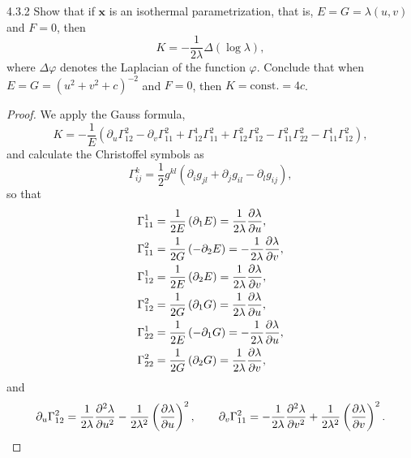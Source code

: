\documentclass[11pt]{article}
\begin{document}
\begin{problem}{4.3.2}
  Show that if \( \mathbf{x} \) is an isothermal parametrization, that is, \( E = G = \lambda(u,v) \) and \( F = 0 \), then
  \begin{equation}
  \label{eq:1}
  K = - \frac{1}{2\lambda}\Delta(\log \lambda),
\end{equation}
where \(\Delta\varphi\) denotes the Laplacian of the function \(\varphi\).
Conclude that when \( E = G = (u^2 + v^2 + c)^{-2} \) and \( F = 0 \), then \( K = \text{const.} = 4c \).
\end{problem}
\begin{proof}
  We apply the Gauss formula,
  \begin{equation}
  \label{eq:3}
  K = - \frac{1}{E} \left( \partial_u\Gamma_{12}^2 - \partial_v\Gamma_{11}^2 + \Gamma_{12}^1\Gamma_{11}^2 + \Gamma_{12}^2\Gamma_{12}^2 - \Gamma_{11}^2 \Gamma_{22}^2 - \Gamma_{11}^1\Gamma_{12}^2 \right),
\end{equation}
and calculate the Christoffel symbols as
\begin{equation}
\label{eq:4}
\Gamma_{ij}^k = \frac{1}{2} g^{kl} \left( \partial_ig_{jl} + \partial_jg_{il} - \partial_lg_{ij} \right),
\end{equation}
so that
\begin{equation}
\label{eq:5}
\begin{aligned}
  \Gamma_{11}^1 &= \frac{1}{2E} \left( \partial_1E \right) = \frac{1}{2\lambda} \pdv{\lambda}{u}, \\
  \Gamma_{11}^2 &= \frac{1}{2G} \left( -\partial_2E \right) = - \frac{1}{2\lambda} \pdv{\lambda}{v}, \\
  \Gamma_{12}^{1} &= \frac{1}{2E} \left( \partial_2E \right) = \frac{1}{2\lambda} \pdv{\lambda}{v}, \\
  \Gamma_{12}^2 &= \frac{1}{2G} \left( \partial_1G \right) = \frac{1}{2\lambda}\pdv{\lambda}{u}, \\
  \Gamma_{22}^1 &= \frac{1}{2E} \left( -\partial_1G \right) = - \frac{1}{2\lambda}\pdv{\lambda}{u}, \\
  \Gamma_{22}^2 &= \frac{1}{2G} \left( \partial_2G \right) = \frac{1}{2\lambda}\pdv{\lambda}{v},
\end{aligned}
\end{equation}
and
\begin{equation}
\label{eq:6}
\partial_u\Gamma_{12}^2 = \frac{1}{2\lambda}\pdv[2]{\lambda}{u} - \frac{1}{2\lambda^2}\left(\pdv{\lambda}{u}\right)^2, \qquad \partial_v\Gamma_{11}^2 = - \frac{1}{2\lambda}\pdv[2]{\lambda}{v} + \frac{1}{2\lambda^2}\left(\pdv{\lambda}{v}\right)^2.
\end{equation}


\end{proof}
\end{document}
